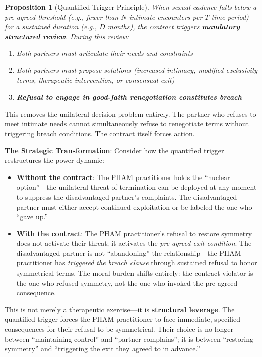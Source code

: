 \documentclass[12pt, letterpaper]{article}
\newtheorem{proposition}{Proposition}[section]
\begin{document}
\begin{proposition}[Quantified Trigger Principle]
When sexual cadence falls below a pre-agreed threshold (e.g., fewer than $N$ intimate encounters per $T$ time period) for a sustained duration (e.g., $D$ months), the contract triggers \textbf{mandatory structured review}. During this review:
\begin{enumerate}
    \item Both partners must articulate their needs and constraints
    \item Both partners must propose solutions (increased intimacy, modified exclusivity terms, therapeutic intervention, or consensual exit)
    \item \textbf{Refusal to engage in good-faith renegotiation constitutes breach}
\end{enumerate}
\end{proposition}

This removes the unilateral decision problem entirely. The partner who refuses to meet intimate needs cannot simultaneously refuse to renegotiate terms without triggering breach conditions. The contract itself forces action.

\textbf{The Strategic Transformation}: Consider how the quantified trigger restructures the power dynamic:

\begin{itemize}
    \item \textbf{Without the contract}: The PHAM practitioner holds the ``nuclear option''---the unilateral threat of termination can be deployed at any moment to suppress the disadvantaged partner's complaints. The disadvantaged partner must either accept continued exploitation or be labeled the one who ``gave up.''
    
    \item \textbf{With the contract}: The PHAM practitioner's refusal to restore symmetry does not activate their threat; it activates the \textit{pre-agreed exit condition}. The disadvantaged partner is not ``abandoning'' the relationship---the PHAM practitioner has \textit{triggered the breach clause} through sustained refusal to honor symmetrical terms. The moral burden shifts entirely: the contract violator is the one who refused symmetry, not the one who invoked the pre-agreed consequence.
\end{itemize}

This is not merely a therapeutic exercise---it is \textbf{structural leverage}. The quantified trigger forces the PHAM practitioner to face immediate, specified consequences for their refusal to be symmetrical. Their choice is no longer between ``maintaining control'' and ``partner complains''; it is between ``restoring symmetry'' and ``triggering the exit they agreed to in advance.''
\end{document}
